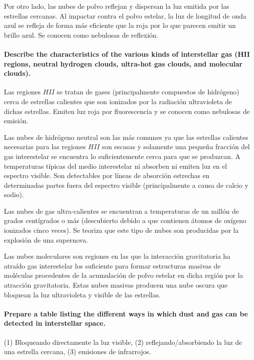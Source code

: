 \documentclass{tufte-handout}
\begin{document}
Por otro lado, las nubes de polvo reflejan y dispersan la luz emitida por las estrellas cercanas. Al impactar contra el polvo estelar, la luz de longitud de onda azul se refleja de forma más eficiente que la roja por lo que parecen emitir un brillo azul. Se conocen como nebulosas de reflexión.

\paragraph{\textbf{Describe the characteristics of the various kinds of interstellar gas (HII regions, neutral hydrogen clouds,
ultra-hot gas clouds, and molecular clouds).}}

Las regiones $HII$ se tratan de gases (principalmente compuestos de hidrógeno) cerca de estrellas calientes que son ionizados por la radiación ultravioleta de dichas estrellas. Emiten luz roja por fluorescencia y se conocen como nebulosas de emisión.

Las nubes de hidrógeno neutral son las más comunes ya que las estrellas calientes necesarias para las regiones $HII$ son escasas y solamente una pequeña fracción del gas interestelar se encuentra lo suficientemente cerca para que se produzcan. A temperaturas típicas del medio interestelar ni absorben ni emiten luz en el espectro visible. Son detectables por líneas de absorción estrechas en determinadas partes fuera del espectro visible (principalmente a causa de calcio y sodio).

Las nubes de gas ultra-calientes se encuentran a temperaturas de un millón de grados centígrados o más (descubierto debido a que contienen átomos de oxígeno ionizados cinco veces). Se teoriza que este tipo de nubes son producidas por la explosión de una supernova.

Las nubes moleculares son regiones en las que la interacción gravitatoria ha atraído gas interestelar los suficiente para formar estructuras masivas de moléculas procedentes de la acumulación de polvo estelar en dicha región por la atracción gravitatoria. Estas nubes masivas producen una nube oscura que bloquean la luz ultravioleta y visible de las estrellas.

\paragraph{\textbf{Prepare a table listing the different ways in which dust and gas can be detected in interstellar space.}}

(1) Bloqueando directamente la luz visible, (2) reflejando/absorbiendo la luz de una estrella cercana, (3) emisiones de infrarrojos.
\end{document}
